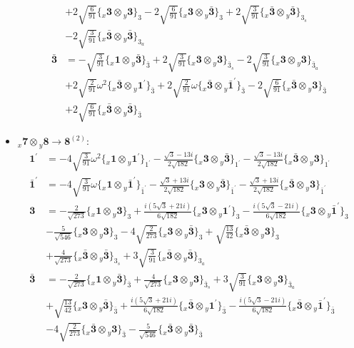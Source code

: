 \documentclass[english]{article}
\newcommand{\rep}[1]{\mathbf{#1}}
\newcommand{\repx}[2]{{}_{#2}\mathbf{#1}}
\newcommand{\subcg}[3]{\big\{ \repx{#1}{x}\otimes\repx{#2}{y}\big\}^{}_{#3}}
\begin{document}
\begin{itemize}
\begin{align*}
 & +2 \sqrt{\frac{6}{91}}\subcg{3}{3}{3}-2 \sqrt{\frac{6}{91}}\subcg{3}{\bar{3}}{3}+2 \sqrt{\frac{3}{91}}\subcg{\bar{3}}{\bar{3}}{3_{s}} \\ 
 & -2 \sqrt{\frac{3}{91}}\subcg{\bar{3}}{\bar{3}}{3_{a}}
\\
\rep{\bar{3}} & = -\sqrt{\frac{3}{91}}\subcg{1}{\bar{3}}{\bar{3}}+2 \sqrt{\frac{3}{91}}\subcg{3}{3}{\bar{3}_{s}}-2 \sqrt{\frac{3}{91}}\subcg{3}{3}{\bar{3}_{a}} \\ 
 & +2 \sqrt{\frac{2}{91}} \omega ^2\subcg{\bar{3}}{1^{\prime}}{\bar{3}}+2 \sqrt{\frac{2}{91}} \omega\subcg{\bar{3}}{\bar{1}^{\prime}}{\bar{3}}-2 \sqrt{\frac{6}{91}}\subcg{\bar{3}}{3}{\bar{3}} \\ 
 & +2 \sqrt{\frac{6}{91}}\subcg{\bar{3}}{\bar{3}}{\bar{3}}
\end{align*}
\item $\repx{7}{x}\otimes\repx{8}{y}\to\rep{8}^{(2)}$:
\begin{align*}
\rep{1^{\prime}} & = -4 \sqrt{\frac{3}{91}} \omega ^2\subcg{1}{1^{\prime}}{1^{\prime}}-\frac{\sqrt{3}-13 i}{2 \sqrt{182}}\subcg{3}{\bar{3}}{1^{\prime}}-\frac{\sqrt{3}-13 i}{2 \sqrt{182}}\subcg{\bar{3}}{3}{1^{\prime}}
\\
\rep{\bar{1}^{\prime}} & = -4 \sqrt{\frac{3}{91}} \omega\subcg{1}{\bar{1}^{\prime}}{\bar{1}^{\prime}}-\frac{\sqrt{3}+13 i}{2 \sqrt{182}}\subcg{3}{\bar{3}}{\bar{1}^{\prime}}-\frac{\sqrt{3}+13 i}{2 \sqrt{182}}\subcg{\bar{3}}{3}{\bar{1}^{\prime}}
\\
\rep{3} & = -\frac{2}{\sqrt{273}}\subcg{1}{3}{3}+\frac{i \left(5 \sqrt{3}+21 i\right)}{6 \sqrt{182}}\subcg{3}{1^{\prime}}{3}-\frac{i \left(5 \sqrt{3}-21 i\right)}{6 \sqrt{182}}\subcg{3}{\bar{1}^{\prime}}{3} \\ 
 & -\frac{5}{\sqrt{546}}\subcg{3}{3}{3}-4 \sqrt{\frac{2}{273}}\subcg{3}{\bar{3}}{3}+\sqrt{\frac{13}{42}}\subcg{\bar{3}}{3}{3} \\ 
 & +\frac{4}{\sqrt{273}}\subcg{\bar{3}}{\bar{3}}{3_{s}}+3 \sqrt{\frac{3}{91}}\subcg{\bar{3}}{\bar{3}}{3_{a}}
\\
\rep{\bar{3}} & = -\frac{2}{\sqrt{273}}\subcg{1}{\bar{3}}{\bar{3}}+\frac{4}{\sqrt{273}}\subcg{3}{3}{\bar{3}_{s}}+3 \sqrt{\frac{3}{91}}\subcg{3}{3}{\bar{3}_{a}} \\ 
 & +\sqrt{\frac{13}{42}}\subcg{3}{\bar{3}}{\bar{3}}+\frac{i \left(5 \sqrt{3}+21 i\right)}{6 \sqrt{182}}\subcg{\bar{3}}{1^{\prime}}{\bar{3}}-\frac{i \left(5 \sqrt{3}-21 i\right)}{6 \sqrt{182}}\subcg{\bar{3}}{\bar{1}^{\prime}}{\bar{3}} \\ 
 & -4 \sqrt{\frac{2}{273}}\subcg{\bar{3}}{3}{\bar{3}}-\frac{5}{\sqrt{546}}\subcg{\bar{3}}{\bar{3}}{\bar{3}}

\end{align*}
\end{itemize}
\end{document}
